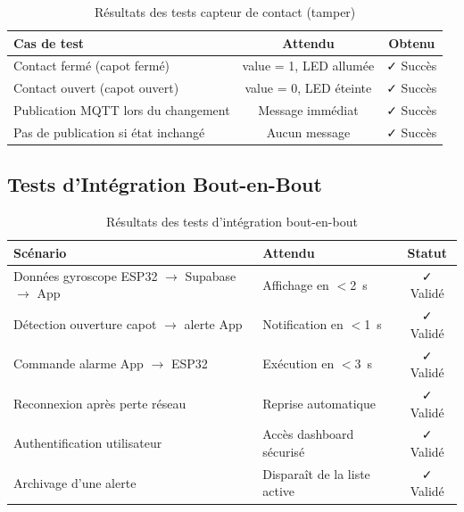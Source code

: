 \documentclass[12pt, a4paper]{report}
\begin{document}
\begin{table}[H]
  \centering
  \caption{Résultats des tests capteur de contact (tamper)}
  \label{tab:test_contact}
  \renewcommand{\arraystretch}{1.4}
  \small
  \begin{tabularx}{\textwidth}{|X|c|c|}
    \hline
    \rowcolor{isimablue!20}
    \textbf{Cas de test} & \textbf{Attendu} & \textbf{Obtenu} \\
    \hline
    Contact fermé (capot fermé) & value = 1, LED allumée & \textcolor{green!60!black}{✓ Succès} \\
    \hline
    Contact ouvert (capot ouvert) & value = 0, LED éteinte & \textcolor{green!60!black}{✓ Succès} \\
    \hline
    Publication MQTT lors du changement & Message immédiat & \textcolor{green!60!black}{✓ Succès} \\
    \hline
    Pas de publication si état inchangé & Aucun message & \textcolor{green!60!black}{✓ Succès} \\
    \hline
  \end{tabularx}
\end{table}

\subsection{Tests d'Intégration Bout-en-Bout}

\begin{table}[H]
  \centering
  \caption{Résultats des tests d'intégration bout-en-bout}
  \label{tab:test_integration}
  \renewcommand{\arraystretch}{1.5}
  \small
  \begin{tabularx}{\textwidth}{|X|p{3cm}|c|}
    \hline
    \rowcolor{isimablue!20}
    \textbf{Scénario} & \textbf{Attendu} & \textbf{Statut} \\
    \hline
    Données gyroscope ESP32 $\to$ Supabase $\to$ App & Affichage en $<$2~s & \textcolor{green!60!black}{✓ Validé} \\
    \hline
    Détection ouverture capot $\to$ alerte App & Notification en $<$1~s & \textcolor{green!60!black}{✓ Validé} \\
    \hline
    Commande alarme App $\to$ ESP32 & Exécution en $<$3~s & \textcolor{green!60!black}{✓ Validé} \\
    \hline
    Reconnexion après perte réseau & Reprise automatique & \textcolor{green!60!black}{✓ Validé} \\
    \hline
    Authentification utilisateur & Accès dashboard sécurisé & \textcolor{green!60!black}{✓ Validé} \\
    \hline
    Archivage d'une alerte & Disparaît de la liste active & \textcolor{green!60!black}{✓ Validé} \\
    \hline
  \end{tabularx}
\end{table}
\end{document}
